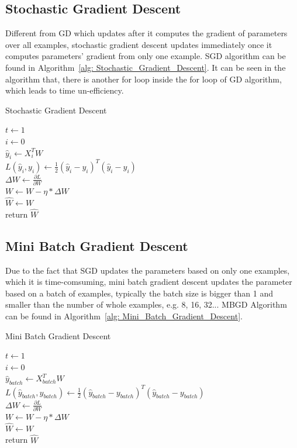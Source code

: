 \documentclass[journal, a4paper]{IEEEtran}
\begin{document}
\subsection{Stochastic Gradient Descent}
Different from GD which updates after it computes the gradient of parameters over all examples, stochastic gradient descent updates immediately once it computes parameters' gradient from only one example. SGD algorithm can be found in Algorithm~\ref{alg: Stochastic_Gradient_Descent}. It can be seen in the algorithm that, there is another for loop inside the for loop of GD algorithm, which leads to time un-efficiency.
\begin{algorithm}
		\label{alg: Stochastic_Gradient_Descent}
	\caption{Stochastic Gradient Descent}
	$t \gets 1$ \\
	{
		$ i \gets 0 $ \\
		{
			$\hat{y}_{i} \gets X^{T}_{i}W $ \\
			$ L(\hat{y}_{i}, y_{i}) \gets \frac{1}{2}(\hat{y}_{i} - y_{i})^{T}(\hat{y}_{i} - y_{i})$ \\
			$\Delta{W} \gets \frac{\partial L}{\partial W}$ \\
			$W \gets W - \eta * \Delta{W}$ \\
		}
	}
	$\hat{W} \gets W$ \\
	return $\hat{W}$
\end{algorithm}

\subsection{Mini Batch Gradient Descent}
Due to the fact that SGD updates the parameters based on only one examples, which it is time-comsuming, mini batch gradient descent updates the parameter based on a batch of examples, typically the batch size is bigger than 1 and smaller than the number of whole examples, e.g. 8, 16, 32... MBGD Algorithm can be found in Algorithm~\ref{alg: Mini_Batch_Gradient_Descent}.
\begin{algorithm}
	\label{alg: Mini_Batch_Gradient_Descent}
	\caption{Mini Batch Gradient Descent}
	$t \gets 1$ \\
	{
		$ i \gets 0 $ \\
		{
			$\hat{y}_{batch} \gets X^{T}_{batch}W $ \\
			$ L(\hat{y}_{batch}, y_{batch}) \gets \frac{1}{2}(\hat{y}_{batch} - y_{batch})^{T}(\hat{y}_{batch} - y_{batch})$ \\
			$\Delta{W} \gets \frac{\partial L}{\partial W}$ \\
			$W \gets W - \eta * \Delta{W}$ \\
		}
	}
	$\hat{W} \gets W$ \\
	return $\hat{W}$
\end{algorithm}
\end{document}
